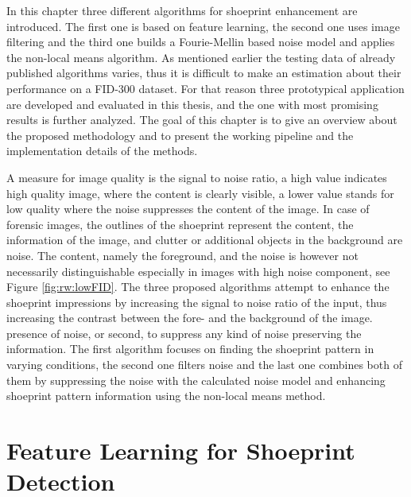 \documentclass[draft,final]{vutinfth} %
\begin{document}
\par
In this chapter three different algorithms for shoeprint enhancement are introduced.
The first one is based on feature learning, the second one uses image filtering and the third one builds a Fourie-Mellin based noise model and applies the non-local means algorithm.
As mentioned earlier the testing data of already published algorithms varies, thus it is difficult to make an estimation about their performance on a FID-300  \cite{kortylewski2014unsupervised} dataset.
For that reason three prototypical application are developed and evaluated in this thesis, and the one with most promising results is further analyzed.
The goal of this chapter is to give an overview about the proposed methodology and to present the working pipeline and the implementation details of the methods.
\par
A measure for image quality is the signal to noise ratio, a high value indicates high quality image, where the content is clearly visible, a lower value stands for low quality where the noise suppresses the content of the image.
In case of forensic images, the outlines of the shoeprint represent the content, the information of the image, and clutter or additional objects in the background are noise. 
The content, namely the foreground, and the noise is however not necessarily distinguishable especially in images with high noise component, see Figure \ref{fig:rw:lowFID}.
The three proposed algorithms attempt to enhance the shoeprint impressions by increasing the signal to noise ratio of the input, thus increasing the contrast between the fore- and the background of the image.
presence of noise, or second, to suppress any kind of noise preserving the information. 
The first algorithm focuses on finding the shoeprint pattern in varying conditions, the second one filters noise and the last one combines both of them by suppressing the noise with the calculated noise model and enhancing shoeprint pattern information using the non-local means method.

\section{Feature Learning for Shoeprint Detection}
\end{document}

